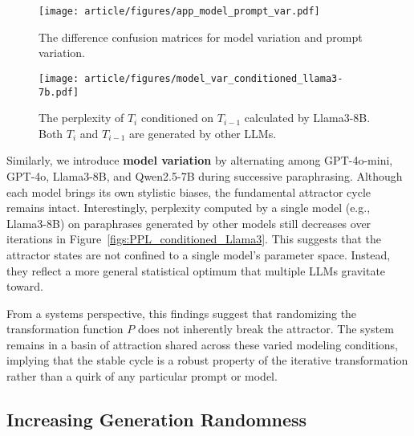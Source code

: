 \begin{figure}[!hb]
    \centering
    \begin{minipage}{0.45\textwidth}
        \centering
        \texttt{[image: article/figures/app\_model\_prompt\_var.pdf]}
        \caption{The difference confusion matrices for model variation and prompt variation.}
        \label{figs:model_prompt_var}
    \end{minipage}
    \hfill
    \begin{minipage}{0.45\textwidth}
          \centering
    \texttt{[image: article/figures/model\_var\_conditioned\_llama3-7b.pdf]}
    \caption{The perplexity of \(T_i\) conditioned on \(T_{i-1}\) calculated by Llama3-8B. Both \(T_i\) and \(T_{i-1}\) are generated by other LLMs. }    
    \label{figs:PPL_conditioned_Llama3}
    \end{minipage}
    \label{fig:overall}
\end{figure}

Similarly, we introduce \textbf{model variation} by alternating among GPT-4o-mini, GPT-4o, Llama3-8B, and Qwen2.5-7B during successive paraphrasing. 
Although each model brings its own stylistic biases, the fundamental attractor cycle remains intact. 
Interestingly, perplexity computed by a single model (e.g., Llama3-8B) on paraphrases generated by other models still decreases over iterations in Figure~\ref{figs:PPL_conditioned_Llama3}. 
This suggests that the attractor states are not confined to a single model’s parameter space.
Instead, they reflect a more general statistical optimum that multiple LLMs gravitate toward.



From a systems perspective, this findings suggest that randomizing the transformation function $P$ does not inherently break the attractor. 
The system remains in a basin of attraction shared across these varied modeling conditions, implying that the stable cycle is a robust property of the iterative transformation rather than a quirk of any particular prompt or model.


\subsection{Increasing Generation Randomness}
\label{sec:temperature}

